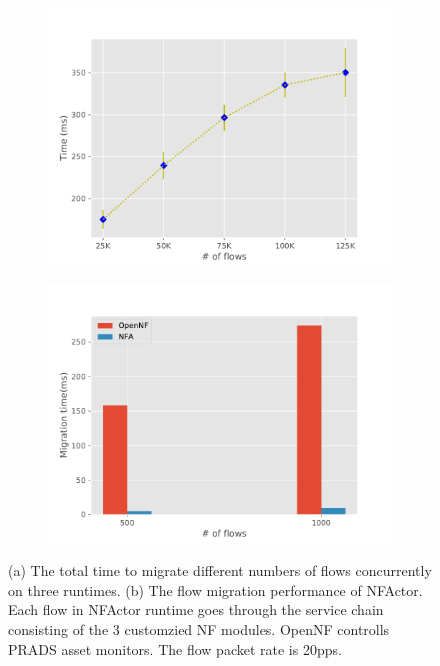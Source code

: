  \begin{figure}[!t]
	\begin{subfigure}[t]{0.49\linewidth}
		\centering
		\includegraphics[width=\columnwidth]{figure/Migration.pdf}
		\caption{}\label{fig:tot-mig} \end{subfigure}\hfill
	 \begin{subfigure}[t]{0.49\linewidth}
		\centering
		\includegraphics[width=\columnwidth]{figure/Compare.pdf}
		\caption{}\label{fig:compare-opennf}
	 \end{subfigure}
\caption{ (a) The total time to migrate different numbers of flows concurrently on three runtimes. (b) The flow migration performance of NFActor. Each flow in NFActor runtime goes through the service chain consisting of the 3 customzied NF modules. OpenNF controlls PRADS asset monitors. The flow packet rate is 20pps.}
\label{fig:mig-perf}
\end{figure}

